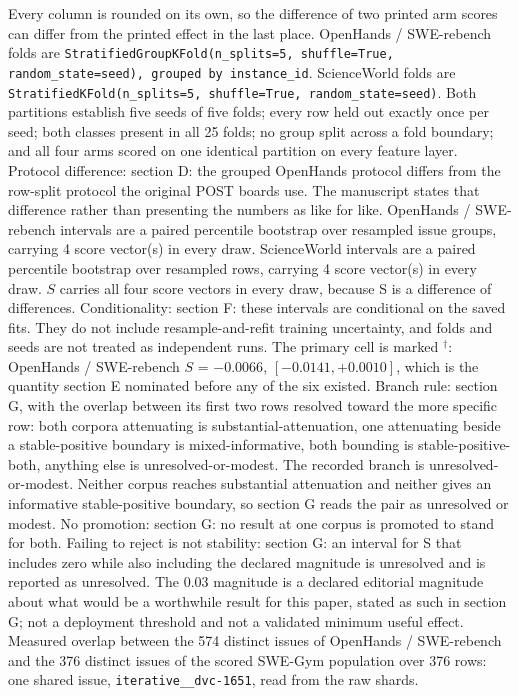 Every column is rounded on its own, so the difference of two printed arm scores can differ from the printed effect in the last place.
OpenHands / SWE-rebench folds are \texttt{StratifiedGroupKFold(n\_splits=5, shuffle=True, random\_state=seed), grouped by instance\_id}.
ScienceWorld folds are \texttt{StratifiedKFold(n\_splits=5, shuffle=True, random\_state=seed)}.
Both partitions establish five seeds of five folds; every row held out exactly once per seed; both classes present in all 25 folds; no group split across a fold boundary; and all four arms scored on one identical partition on every feature layer.
Protocol difference: section D: the grouped OpenHands protocol differs from the row-split protocol the original POST boards use. The manuscript states that difference rather than presenting the numbers as like for like.
OpenHands / SWE-rebench intervals are a paired percentile bootstrap over resampled issue groups, carrying 4 score vector(s) in every draw.
ScienceWorld intervals are a paired percentile bootstrap over resampled rows, carrying 4 score vector(s) in every draw.
$S$ carries all four score vectors in every draw, because S is a difference of differences.
Conditionality: section F: these intervals are conditional on the saved fits. They do not include resample-and-refit training uncertainty, and folds and seeds are not treated as independent runs.
The primary cell is marked $^{\dagger}$: OpenHands / SWE-rebench $S$ = $-0.0066$, $[-0.0141, +0.0010]$, which is the quantity section E nominated before any of the six existed.
Branch rule: section G, with the overlap between its first two rows resolved toward the more specific row: both corpora attenuating is substantial-attenuation, one attenuating beside a stable-positive boundary is mixed-informative, both bounding is stable-positive-both, anything else is unresolved-or-modest.
The recorded branch is unresolved-or-modest. Neither corpus reaches substantial attenuation and neither gives an informative stable-positive boundary, so section G reads the pair as unresolved or modest.
No promotion: section G: no result at one corpus is promoted to stand for both.
Failing to reject is not stability: section G: an interval for S that includes zero while also including the declared magnitude is unresolved and is reported as unresolved.
The 0.03 magnitude is a declared editorial magnitude about what would be a worthwhile result for this paper, stated as such in section G; not a deployment threshold and not a validated minimum useful effect.
Measured overlap between the 574 distinct issues of OpenHands / SWE-rebench and the 376 distinct issues of the scored SWE-Gym population over 376 rows: one shared issue, \texttt{iterative\_\_dvc-1651}, read from the raw shards.

